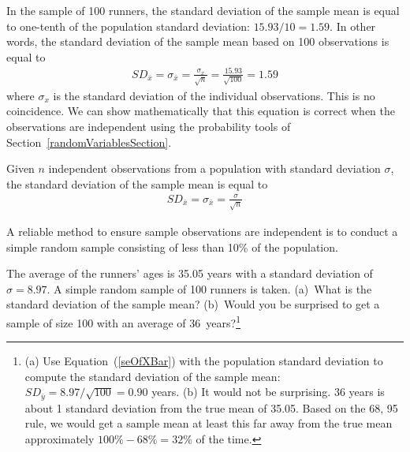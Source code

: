 In the sample of 100 runners, the standard deviation of the sample mean is equal to one-tenth of the population standard deviation: $15.93/10 = 1.59$. In other words, the standard deviation of the sample mean based on 100 observations is equal to
\begin{eqnarray*}
SD_{\bar{x}} = \sigma_{\bar{x}} = \frac{\sigma_{x}}{\sqrt{n}} = \frac{15.93}{\sqrt{100}} = 1.59
\end{eqnarray*}
where $\sigma_{x}$ is the standard deviation of the individual observations. This is no coincidence. We can show mathematically that this equation is correct when the observations are independent  using the probability tools of Section~\ref{randomVariablesSection}.

\begin{termBox}{
Given $n$ independent observations from a population with standard deviation $\sigma$, the standard deviation of the sample mean is equal to \vspace{-1mm}
\begin{eqnarray}
SD_{\bar{x}} = \sigma_{\bar{x}} =  \frac{\sigma}{\sqrt{n}}
\label{seOfXBar}
\end{eqnarray}\vspace{-3mm}

A reliable method to ensure sample observations are independent is to conduct a simple random sample consisting of less than 10\% of the population.}
\end{termBox}

\begin{exercise}
The average of the runners' ages is 35.05 years with a standard deviation of $\sigma = 8.97$. A simple random sample of 100 runners is taken.  (a)~What is the standard deviation of the sample mean? (b)~Would you be surprised to get a sample of size 100 with an average of 36~years?\footnote{(a) Use Equation~(\ref{seOfXBar}) with the population standard deviation to compute the standard deviation of the sample mean: $SD_{\bar{y}} = 8.97/\sqrt{100} = 0.90$ years. (b) It would not be surprising. 36 years is about 1 standard deviation from the true mean of 35.05. Based on the 68, 95 rule, we would get a sample mean at least this far away from the true mean approximately $100\% - 68\% = 32\%$ of the time.}
\end{exercise}


